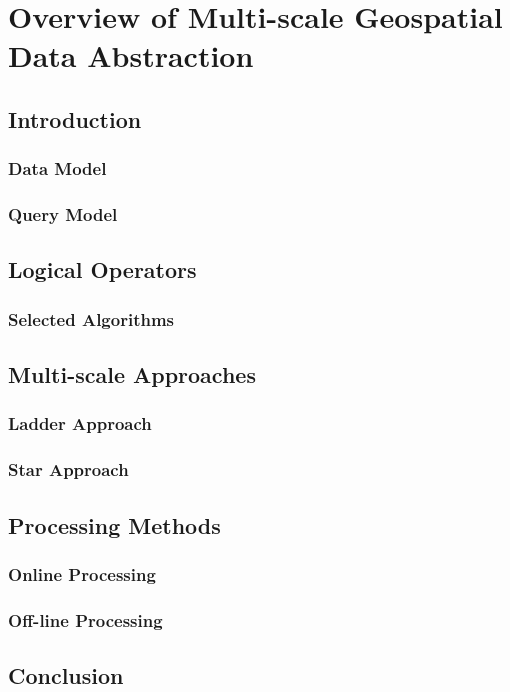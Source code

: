 \chapter{Overview of Multi-scale Geospatial Data Abstraction}

\section{Introduction}

\subsection{Data Model}
\subsection{Query Model}

\section{Logical Operators}

\subsection{Selected Algorithms}

\section{Multi-scale Approaches}
\subsection{Ladder Approach}
\subsection{Star Approach}

\section{Processing Methods}
\subsection{Online Processing}

\subsection{Off-line Processing}

\section{Conclusion}

